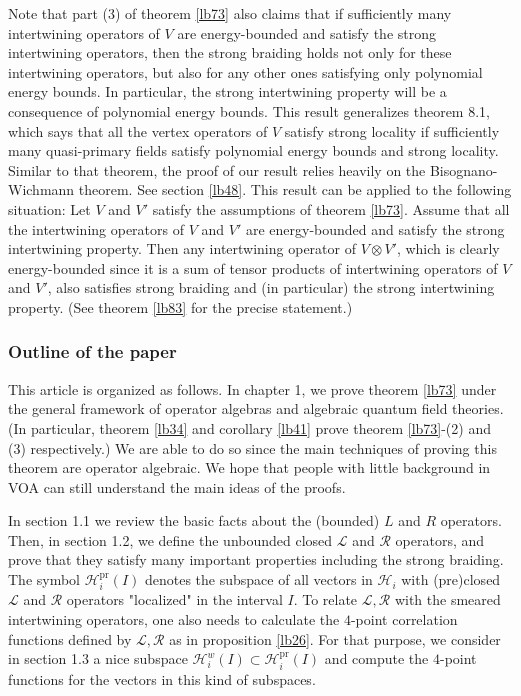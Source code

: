 \documentclass[12pt,a4paper]{article}
\theoremstyle{definition}
\theoremstyle{plain}
\newcommand{\mc}{\mathcal}
\newcommand{\scr}{\mathscr}
\newcommand{\pr}{\mathrm{pr}}
\numberwithin{equation}{subsection}
\begin{document}
Note that part (3) of theorem \ref{lb73} also claims that if sufficiently many intertwining operators of $V$ are energy-bounded and satisfy the strong intertwining operators, then the strong braiding holds not only for these intertwining operators, but also for any other ones satisfying only polynomial energy bounds. In particular, the strong intertwining property will be a consequence of polynomial energy bounds. This result generalizes \cite{CKLW18} theorem 8.1, which says that all the vertex operators of $V$ satisfy strong locality if sufficiently many quasi-primary fields satisfy polynomial energy bounds and strong locality. Similar to that theorem, the proof of our result relies heavily on the Bisognano-Wichmann theorem. See section \ref{lb48}. This result can be applied to the following situation: Let $V$ and $V'$ satisfy the assumptions of theorem \ref{lb73}. Assume that all the intertwining operators of $V$ and $V'$ are energy-bounded and satisfy the strong intertwining property. Then any intertwining operator of $V\otimes V'$, which is clearly energy-bounded since it is a sum of tensor products of intertwining operators of $V$ and $V'$, also satisfies  strong braiding and (in particular) the strong intertwining property. (See theorem \ref{lb83} for the precise statement.) 













\subsubsection*{Outline of the paper}

This article is organized as follows. In chapter 1, we prove theorem \ref{lb73} under the general framework of operator algebras and algebraic quantum field theories. (In particular, theorem \ref{lb34} and corollary \ref{lb41} prove theorem \ref{lb73}-(2) and  (3) respectively.) We are able to do so since the main techniques of proving this theorem are operator algebraic. We hope that people with little background in VOA can still understand the main ideas of the proofs.

In section 1.1 we review the basic facts about the  (bounded) $L$ and $R$ operators. Then, in section 1.2, we define  the unbounded closed $\scr L$ and $\scr R$ operators, and prove that they satisfy many important properties including the strong braiding. The symbol $\mc H_i^\pr(I)$ denotes the subspace  of all vectors in $\mc H_i$ with (pre)closed $\scr L$ and $\scr R$ operators "localized" in the interval $I$. To relate $\scr L,\scr R$ with the smeared intertwining operators, one also needs to calculate the $4$-point correlation functions defined by $\scr L,\scr R$ as in proposition \ref{lb26}. For that purpose, we consider in section 1.3 a nice subspace $\mc H_i^w(I)\subset \mc H_i^\pr(I)$ and compute the $4$-point functions for the vectors in this kind of subspaces.
\end{document}
